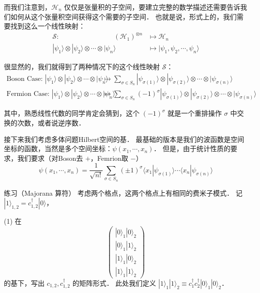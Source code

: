 而我们注意到，$\mathcal{H}_n$ 仅仅是张量积的子空间，要建立完整的数学描述还需要告诉我们如何从这个张量积空间获得这个需要的子空间． 也就是说，形式上的，我们需要找到这么一个线性映射：
\begin{align}
\mathcal{S}:\quad\quad\quad\quad\quad\quad\quad\quad (\mathcal{H}_1)^{\otimes n}&\mapsto\mathcal{H}_n\\
|\psi_1\rangle\otimes|\psi_2\rangle\otimes\cdots\otimes|\psi_n\rangle &\mapsto|\psi_1,\psi_2,\cdots,\psi_n\rangle
\end{align}

很显然的，我们就得到了两种情况下的这个线性映射 $\mathcal{S}$：
\begin{align}
\text{Boson Case: }
|\psi_1\rangle\otimes|\psi_2\rangle\otimes\cdots\otimes|\psi_n\rangle &\mapsto \sum_{{\sigma}\in S_n}|\psi_{\sigma(1)}\rangle\otimes|\psi_{\sigma(2)}\rangle\otimes\cdots\otimes|\psi_{\sigma(n)}\rangle\\
\text{Fermion Case: }
|\psi_1\rangle\otimes|\psi_2\rangle\otimes\cdots\otimes|\psi_n\rangle &\mapsto \sum_{{\sigma}\in S_n}(-1)^{\sigma}|\psi_{\sigma(1)}\rangle\otimes|\psi_{\sigma(2)}\rangle\otimes\cdots\otimes|\psi_{\sigma(n)}\rangle
\end{align}

其中，熟悉线性代数的同学肯定会猜到，这个 $(-1)^{\sigma}$ 就是一个重排操作 $\sigma$ 中交换的次数，或者说逆序数．

接下来我们考虑多体问题Hilbert空间的基． 最基础的版本是我们的波函数是空间坐标的函数，当然是多个空间坐标：$\psi(x_1,\cdots,x_n)$． 但是，由于统计性质的要求，我们要求（对Boson去 $+$，Femrion取 $-$）
\begin{equation}
\psi(x_1,\cdots,x_n)=\frac{1}{\sqrt{n!}}\sum_{\sigma\in S_n}(\pm1)^\sigma\langle x_1|\psi_{\sigma(1)}\rangle\cdots\langle x_n|\psi_{\sigma(n)}\rangle
\end{equation}

\begin{exer}{练习（Majorana 算符）}
考虑两个格点，这两个格点上有相同的费米子模式． 记 $|1\rangle_{1,2}=c_{1,2}^\dagger|0\rangle$，

(1) 在
\begin{equation}
\left(\begin{matrix}|0\rangle_1|0\rangle_2\\|0\rangle_1|1\rangle_2\\|1\rangle_1|0\rangle_2\\|1\rangle_1|1\rangle_2\end{matrix}\right) 
\end{equation}
的基下，写出 $c_{1,2}, c_{1,2}^\dagger$ 的矩阵形式． 此处我们定义 $|1\rangle_1|1\rangle_2\equiv c_1^\dagger c_2^\dagger|0\rangle_1|0\rangle_2$．
\end{exer}